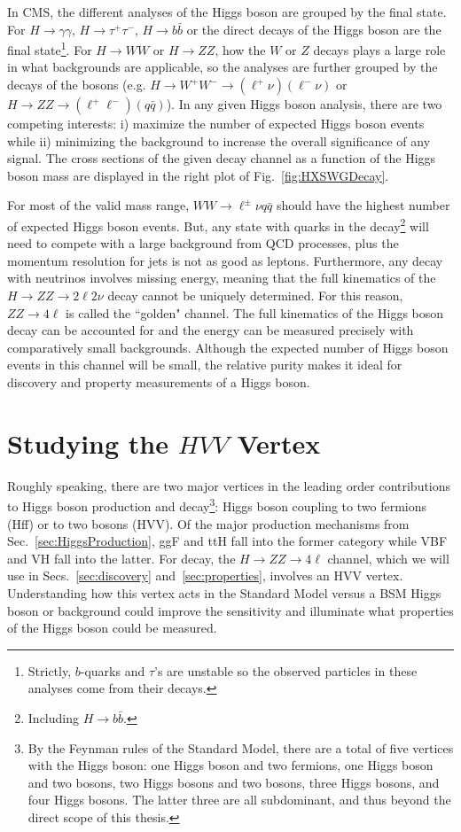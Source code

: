 In CMS, the different analyses of the Higgs boson are grouped by the final state. For $H\rightarrow \gamma\gamma$, $H\rightarrow\tau^+\tau^-$, $H\rightarrow b\bar{b}$ or the direct decays of the Higgs boson are the final state\footnote{Strictly, $b$-quarks and $\tau$'s are unstable so the observed particles in these analyses come from their decays.}. For $H\rightarrow WW$ or $H\rightarrow ZZ$, how the $W$ or $Z$ decays plays a large role in what backgrounds are applicable, so the analyses are further grouped by the decays of the bosons (e.g. $H\rightarrow W^+W^- \rightarrow (\ell^+\nu)(\ell^-\nu)$ or $H\rightarrow ZZ \rightarrow (\ell^+\ell^-)(q\bar{q})$). In any given Higgs boson analysis, there are two competing interests: i) maximize the number of expected Higgs boson events while ii) minimizing the background to increase the overall significance of any signal. The cross sections of the given decay channel as a function of the Higgs boson mass are displayed in the right plot of Fig.~\ref{fig:HXSWGDecay}.

For most of the valid mass range, $WW\rightarrow \ell^{\pm}\nu q\bar{q}$ should have the highest number of expected Higgs boson events. But, any state with quarks in the decay\footnote{Including $H\rightarrow b\bar{b}$.} will need to compete with a large background from QCD processes, plus the momentum resolution for jets is not as good as leptons. Furthermore, any decay with neutrinos involves missing energy, meaning that the full kinematics of the $H\rightarrow ZZ\rightarrow 2\ell2\nu$ decay cannot be uniquely determined. For this reason, $ZZ\rightarrow 4\ell$ is called the ``golden" channel. The full kinematics of the Higgs boson decay can be accounted for and the energy can be measured precisely with comparatively small backgrounds. Although the expected number of Higgs boson events in this channel will be small, the relative purity makes it ideal for discovery and property measurements of a Higgs boson. 

\section{Studying the $HVV$ Vertex}
\label{sec:HVVVertex}

Roughly speaking, there are two major vertices in the leading order contributions to Higgs boson production and decay\footnote{By the Feynman rules of the Standard Model, there are a total of five vertices with the Higgs boson: one Higgs boson and two fermions, one Higgs boson and two bosons, two Higgs bosons and two bosons, three Higgs bosons, and four Higgs bosons. The latter three are all subdominant, and thus beyond the direct scope of this thesis.}: Higgs boson coupling to two fermions (Hff) or to two bosons (HVV). Of the major production mechanisms from Sec.~\ref{sec:HiggsProduction}, ggF and ttH fall into the former category while VBF and VH fall into the latter. For decay, the $H\rightarrow ZZ \rightarrow 4\ell$ channel, which we will use in Secs.~\ref{sec:discovery} and~\ref{sec:properties}, involves an HVV vertex. Understanding how this vertex acts in the Standard Model versus a BSM Higgs boson or background could improve the sensitivity and illuminate what properties of the Higgs boson could be measured.

